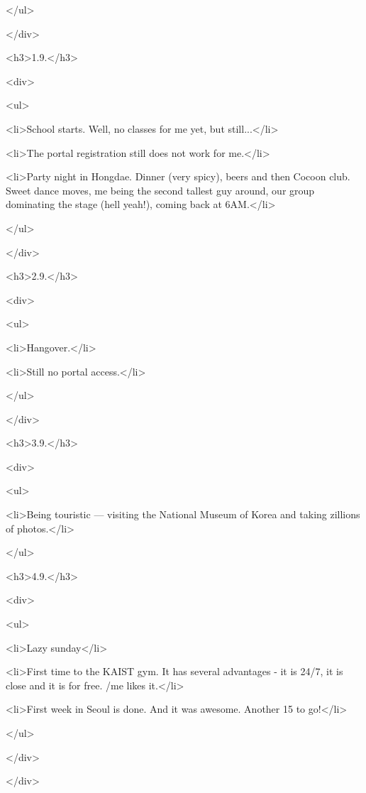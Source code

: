 \begin{post}
\begin{content}
</ul>

</div>

<h3>1.9.</h3>

<div>

<ul>

	<li>School starts. Well, no classes for me yet, but still...</li>

	<li>The portal registration still does not work for me.</li>

	<li>Party night in Hongdae. Dinner (very spicy), beers and then Cocoon club. Sweet dance moves, me being the second tallest guy around, our group dominating the stage (hell yeah!), coming back at 6AM.</li>

</ul>

</div>

<h3>2.9.</h3>

<div>

<ul>

	<li>Hangover.</li>

	<li>Still no portal access.</li>

</ul>

</div>

<h3>3.9.</h3>

<div>

<ul>

	<li>Being touristic — visiting the National Museum of Korea and taking zillions of photos.</li>

</ul>

<h3>4.9.</h3>

<div>

<ul>

	<li>Lazy sunday</li>

	<li>First time to the KAIST gym. It has several advantages - it is 24/7, it is close and it is for free. /me likes it.</li>

	<li>First week in Seoul is done. And it was awesome. Another 15 to go!</li>

</ul>

</div>

</div>
	\end{content}
\end{post}
